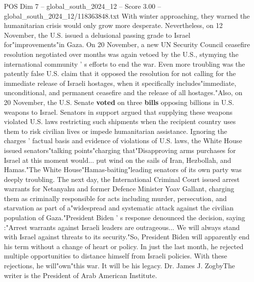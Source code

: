 \begin{textsample}{POS Dim 7 – global\_south\_2024\_12 – Score 3.00 – global\_south\_2024\_12/118363848.txt}
With winter approaching, they warned the humanitarian crisis would only grow more desperate.
Nevertheless, on 12 November, the U.S. issued a delusional passing grade to Israel for"improvements"in Gaza.
On 20 November, a new UN Security Council ceasefire resolution negotiated over months was again vetoed by the U.S., stymying the international community ' s efforts to end the war.
Even more troubling was the patently false U.S. claim that it opposed the resolution for not calling for the immediate release of Israeli hostages, when it specifically includes"immediate, unconditional, and permanent ceasefire and the release of all hostages."Also, on 20 November, the U.S.
Senate \textbf{voted} on three \textbf{bills} opposing billions in U.S. weapons to Israel.
Senators in support argued that supplying these weapons violated U.S. laws restricting such shipments when the recipient country uses them to risk civilian lives or impede humanitarian assistance.
Ignoring the charges ' factual basis and evidence of violations of U.S. laws, the White House issued senators"talking points"charging that"Disapproving arms purchases for Israel at this moment would... put wind on the sails of Iran, Hezbollah, and Hamas."The White House"Hamas-baiting"leading senators of its own party was deeply troubling.
The next day, the International Criminal Court issued arrest warrants for Netanyahu and former Defence Minister Yoav Gallant, charging them as criminally responsible for acts including murder, persecution, and starvation as part of a"widespread and systematic attack against the civilian population of Gaza."President Biden ' s response denounced the decision, saying :"Arrest warrants against Israeli leaders are outrageous...
We will always stand with Israel against threats to its security."So, President Biden will apparently end his term without a change of heart or policy.
In just the last month, he rejected multiple opportunities to distance himself from Israeli policies.
With these rejections, he will"own"this war.
It will be his legacy.
Dr.
James J.
ZogbyThe writer is the President of Arab American Institute.

\end{textsample}
